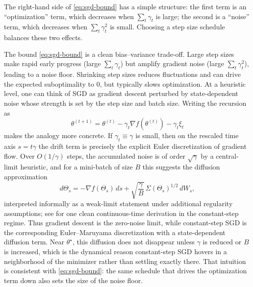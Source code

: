 The right-hand side of \eqref{eq:sgd-bound} has a simple structure:
the first term is an ``optimization'' term, which decreases when $\sum_t \gamma_t$ is large; the second is a ``noise'' term, which decreases when $\sum_t \gamma_t^2$ is small.
Choosing a step size schedule balances these two effects.

The bound \eqref{eq:sgd-bound} is a clean bias--variance trade-off.
Large step sizes make rapid early progress (large $\sum_t \gamma_t$) but amplify gradient noise (large $\sum_t \gamma_t^2$), leading to a noise floor.
Shrinking step sizes reduces fluctuations and can drive the expected suboptimality to $0$, but typically slows optimization.
At a heuristic level, one can think of SGD as gradient descent perturbed by state-dependent noise whose strength is set by the step size and batch size.
Writing the recursion as
\[
  \theta^{(t+1)} = \theta^{(t)} - \gamma_t \nabla f(\theta^{(t)}) - \gamma_t \xi_t
\]
makes the analogy more concrete.
If $\gamma_t\equiv \gamma$ is small, then on the rescaled time axis $s=t\gamma$ the drift term is precisely the explicit Euler discretization of gradient flow.
Over $O(1/\gamma)$ steps, the accumulated noise is of order $\sqrt{\gamma}$ by a central-limit heuristic, and for a mini-batch of size $B$ this suggests the diffusion approximation
\begin{equation}
  d\Theta_s
  =
  -\nabla f(\Theta_s)\,ds
  + \sqrt{\frac{\gamma}{B}}\,\Sigma(\Theta_s)^{1/2}\,dW_s,
  \label{eq:sgd-sde}
\end{equation}
interpreted informally as a weak-limit statement under additional regularity assumptions; see \citet[\S2]{mandt_hoffman_blei_2015_ct_limit_sgd} for one clean continuous-time derivation in the constant-step regime.
Thus gradient descent is the zero-noise limit, while constant-step SGD is the corresponding Euler--Maruyama discretization with a state-dependent diffusion term.
Near $\theta^\star$, this diffusion does not disappear unless $\gamma$ is reduced or $B$ is increased, which is the dynamical reason constant-step SGD hovers in a neighborhood of the minimizer rather than settling exactly there.
That intuition is consistent with \eqref{eq:sgd-bound}: the same schedule that drives the optimization term down also sets the size of the noise floor.

